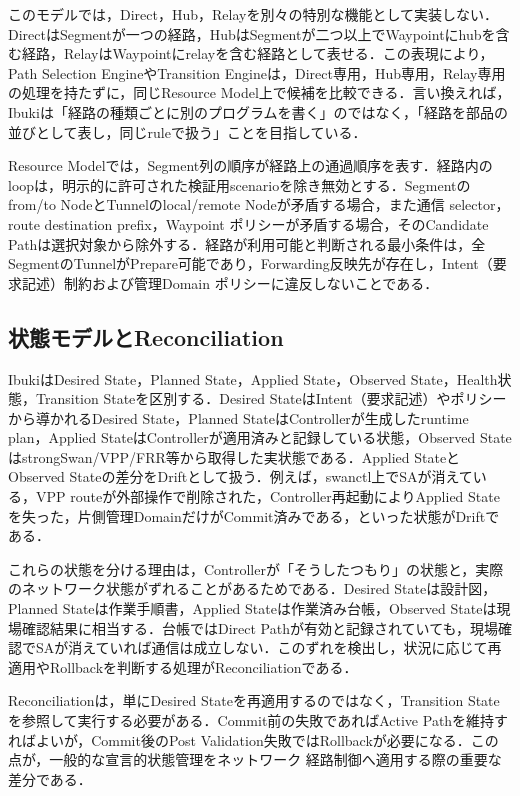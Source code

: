 \documentclass[11pt,a4paper,twoside]{ltjsarticle}
\begin{document}
このモデルでは，Direct，Hub，Relayを別々の特別な機能として実装しない．DirectはSegmentが一つの経路，HubはSegmentが二つ以上でWaypointにhubを含む経路，RelayはWaypointにrelayを含む経路として表せる．この表現により，Path Selection EngineやTransition Engineは，Direct専用，Hub専用，Relay専用の処理を持たずに，同じResource Model上で候補を比較できる．言い換えれば，Ibukiは「経路の種類ごとに別のプログラムを書く」のではなく，「経路を部品の並びとして表し，同じruleで扱う」ことを目指している．

Resource Modelでは，Segment列の順序が経路上の通過順序を表す．経路内のloopは，明示的に許可された検証用scenarioを除き無効とする．Segmentのfrom/to NodeとTunnelのlocal/remote Nodeが矛盾する場合，また通信 selector，route destination prefix，Waypoint ポリシーが矛盾する場合，そのCandidate Pathは選択対象から除外する．経路が利用可能と判断される最小条件は，全SegmentのTunnelがPrepare可能であり，Forwarding反映先が存在し，Intent（要求記述）制約および管理Domain ポリシーに違反しないことである．

\subsection{状態モデルとReconciliation}
IbukiはDesired State，Planned State，Applied State，Observed State，Health状態，Transition Stateを区別する．Desired StateはIntent（要求記述）やポリシーから導かれるDesired State，Planned StateはControllerが生成したruntime plan，Applied StateはControllerが適用済みと記録している状態，Observed StateはstrongSwan/VPP/FRR等から取得した実状態である．Applied StateとObserved Stateの差分をDriftとして扱う．例えば，swanctl上でSAが消えている，VPP routeが外部操作で削除された，Controller再起動によりApplied Stateを失った，片側管理DomainだけがCommit済みである，といった状態がDriftである．

これらの状態を分ける理由は，Controllerが「そうしたつもり」の状態と，実際のネットワーク状態がずれることがあるためである．Desired Stateは設計図，Planned Stateは作業手順書，Applied Stateは作業済み台帳，Observed Stateは現場確認結果に相当する．台帳ではDirect Pathが有効と記録されていても，現場確認でSAが消えていれば通信は成立しない．このずれを検出し，状況に応じて再適用やRollbackを判断する処理がReconciliationである．

Reconciliationは，単にDesired Stateを再適用するのではなく，Transition Stateを参照して実行する必要がある．Commit前の失敗であればActive Pathを維持すればよいが，Commit後のPost Validation失敗ではRollbackが必要になる．この点が，一般的な宣言的状態管理をネットワーク 経路制御へ適用する際の重要な差分である．
\end{document}
